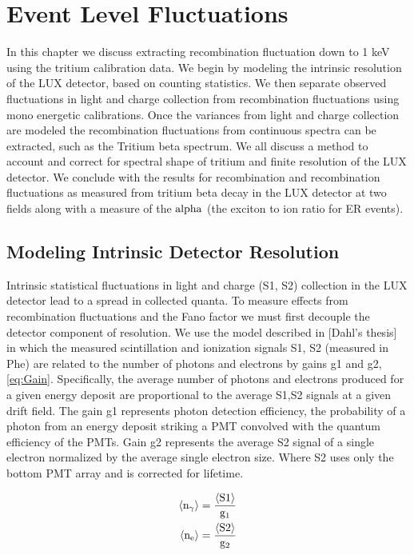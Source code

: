 \renewcommand{\thechapter}{5}

\chapter{Event Level Fluctuations}
\label{Ch:Flucs}

In this chapter we discuss extracting recombination fluctuation down to 1 keV using the tritium calibration data. We begin by modeling the intrinsic resolution of the LUX detector, based on counting statistics. We then separate observed fluctuations in light and charge collection from recombination fluctuations using mono energetic calibrations. Once the variances from light and charge collection are modeled the recombination fluctuations from continuous spectra can be extracted, such as the Tritium beta spectrum. We all discuss a method to account and correct for spectral shape of tritium and finite resolution of the LUX detector. We conclude with the results for recombination and recombination fluctuations as measured from tritium beta decay in the LUX detector at two fields along with a measure of the $\rm alpha$ (the exciton to ion ratio for ER events).


\section{Modeling Intrinsic Detector Resolution}

Intrinsic statistical fluctuations in light and charge (S1, S2) collection in the LUX detector lead to a spread in collected quanta. To measure effects from recombination fluctuations and the Fano factor we must first decouple the detector component of resolution. We use the model described in [Dahl's thesis] in which the measured scintillation and ionization signals S1, S2 (measured in Phe) are related to the number of photons and electrons by gains g1 and g2, \ref{eq:Gain}. Specifically, the average number of photons and electrons produced for a given energy deposit are proportional to the average S1,S2 signals at a given drift field. The gain g1 represents photon detection efficiency, the probability of a photon from an energy deposit striking a PMT convolved with the quantum efficiency of the PMTs. Gain g2 represents the average S2 signal of a single electron normalized by the average single electron size. Where S2 uses only the bottom PMT array and is corrected for lifetime.


\begin{equation}
\begin{split}
\rm  \left<n_\gamma\right> = \frac{\left<S1\right>}{g_1}\\
\rm \left<n_{e}\right> = \frac{\left<S2\right>}{g_2}
\label{eq:Gain}
\end{split}
\end{equation}

